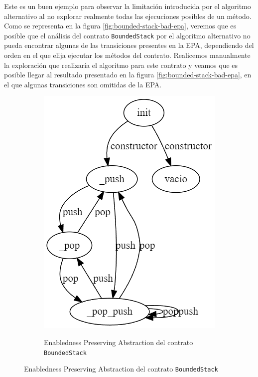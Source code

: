 Este es un buen ejemplo para observar la limitación introducida por el algoritmo alternativo al no explorar realmente todas las ejecuciones posibles de un método.
Como se representa en la figura \ref{fig:bounded-stack-bad-epa}, veremos que es posible que el análisis del contrato \texttt{BoundedStack} por el algoritmo alternativo no pueda encontrar algunas de las transiciones presentes en la EPA, dependiendo del orden en el que elija ejecutar los métodos del contrato.
Realicemos manualmente la exploración que realizaría el algoritmo para este contrato y veamos que es posible llegar al resultado presentado en la figura \ref{fig:bounded-stack-bad-epa}, en el que algunas transiciones son omitidas de la EPA.
\begin{figure}[H]
    \centering
    \begin{subfigure}{0.4\textwidth}
        {\includegraphics[width=\textwidth]{figs/bounded-stack-good-epa.png}}
        \caption{Enabledness Preserving Abstraction del contrato \texttt{BoundedStack}}

\end{subfigure}
\end{figure}
